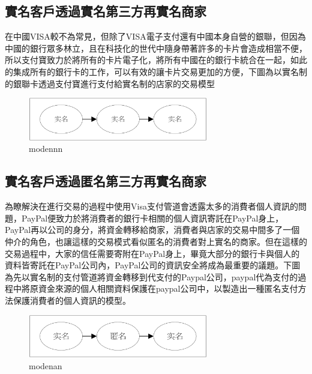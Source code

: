 		\subsection{實名客戶透過實名第三方再實名商家}
		在中國VISA較不為常見，但除了VISA電子支付還有中國本身自營的銀聯，但因為中國的銀行眾多林立，且在科技化的世代中隨身帶著許多的卡片會造成相當不便，所以支付寶致力於將所有的卡片電子化，將所有中國在的銀行卡統合在一起，如此的集成所有的銀行卡的工作，可以有效的讓卡片交易更加的方便，下圖為以實名制的銀聯卡透過支付寶進行支付給實名制的店家的交易模型

		\begin{figure}[h]
			\centering
			\includegraphics[width = 0.7\textwidth]{modennn.png}
			\caption{modennn}\label{modennn}
		\end{figure}


		\subsection{實名客戶透過匿名第三方再實名商家}
		為瞭解決在進行交易的過程中使用Visa支付管道會透露太多的消費者個人資訊的問題，PayPal便致力於將消費者的銀行卡相關的個人資訊寄託在PayPal身上，PayPal再以公司的身分，將資金轉移給商家，消費者與店家的交易中間多了一個仲介的角色，也讓這樣的交易模式看似匿名的消費者對上實名的商家。但在這樣的交易過程中，大家的信任需要寄附在PayPal身上，畢竟大部分的銀行卡與個人的資料皆寄託在PayPal公司內，PayPal公司的資訊安全將成為最重要的議題。下圖為先以實名制的支付管道將資金轉移到代支付的Paypal公司，paypal代為支付的過程中將原資金來源的個人相關資料保護在paypal公司中，以製造出一種匿名支付方法保護消費者的個人資訊的模型。

		\begin{figure}[h]
			\centering
			\includegraphics[width = 0.7\textwidth]{modenan.png}
			\caption{modenan}\label{modenan}
		\end{figure}



